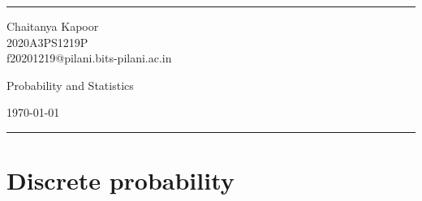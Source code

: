 \documentclass[a4paper]{article}
\begin{document}

\fancyhead[C]{}
\hrule \medskip %
\begin{minipage}{0.295\textwidth} 
\raggedright
\footnotesize
Chaitanya Kapoor \hfill\\   
2020A3PS1219P\hfill\\
f20201219@pilani.bits-pilani.ac.in
\end{minipage}
\begin{minipage}{0.4\textwidth} 
\centering 
\Large
Probability and Statistics
\end{minipage}
\begin{minipage}{0.295\textwidth} 
\raggedleft
\today\hfill\\
\end{minipage}
\medskip\hrule 
\bigskip

\section{Discrete probability}
\end{document}
